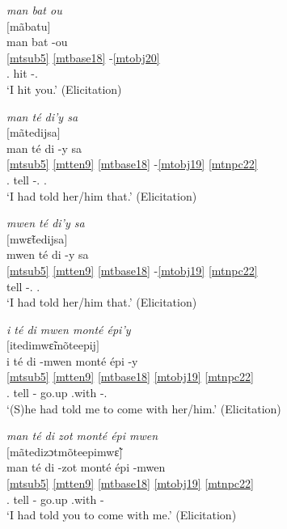 \documentclass[output=paper]{langscibook}
\begin{document}
\ea\label{bkm:Ref105166218}
\textit{man bat ou}\\
$[$mãbatu$]$\\
\glll man bat -ou\\
\ref{mtsub5} \ref{mtbase18} -\ref{mtobj20} \\
\First\Sg.\Sarg{} hit -\Second\Sg.\Obj{}\\
\glt `I hit you.' (Elicitation)
\z

\ea\label{bkm:Ref105166237}
\textit{man té di’y sa}\\
$[$mãtedijsa$]$\\
\glll man té di -y sa\\
\ref{mtsub5} \ref{mtten9} \ref{mtbase18} -\ref{mtobj19} \ref{mtnpc22} \\
\First\Sg.\Sarg{} \Pst{} tell -\Third\Sg.\Obj{} \Dem{}.\Pr{}\\
\glt `I had told her/him that.' (Elicitation)
\z

\ea\label{bkm:Ref105167438}
\textit{mwen té di’y sa}\\
$[$mwɛ̃tedijsa$]$\\
\glll mwen té di -y sa\\
\ref{mtsub5} \ref{mtten9} \ref{mtbase18} -\ref{mtobj19} \ref{mtnpc22} \\
\First\Sg{} \Pst{} tell -\Third\Sg.\Obj{} \Dem{}.\Pr{}\\
\glt `I had told her/him that.' (Elicitation)
\z

\ea\label{bkm:Ref105166251}
\textit{i té di mwen monté épi’y}\\
$[$itedimwɛ̃mõteepij$]$\\
\glll i té di -mwen monté épi -y\\
\ref{mtsub5} \ref{mtten9} \ref{mtbase18} \ref{mtobj19} \ref{mtnpc22} {} {} \\
\Third\Sg.\Sarg{} \Pst{} tell -\First\Sg{} go.up \Prep{}.with -\Third\Sg.\Obj{}\\
\glt `(S)he had told me to come with her/him.' (Elicitation)
\z

\ea\label{bkm:Ref105166274}
\textit{man té di zot monté épi mwen}\\
$[$mãtedizɔtmõteepimwɛ̃$]$\\
\glll man té di -zot monté épi -mwen\\
  \ref{mtsub5} \ref{mtten9} \ref{mtbase18} \ref{mtobj19} \ref{mtnpc22} {} {} \\
\First\Sg.\Sarg{} \Pst{} tell -\Second\Pl{} go.up \Prep{}.with -\First\Sg{}\\
\glt `I had told you to come with me.' (Elicitation)
\z
\end{document}
